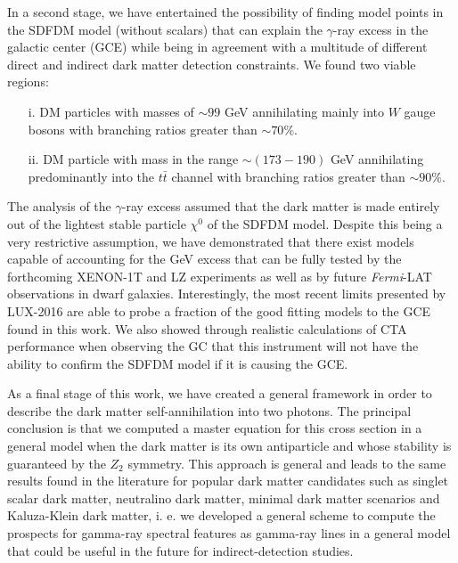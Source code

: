 In a second stage, we have entertained the possibility of finding model points in the SDFDM model (without scalars) that can explain the $\gamma$-ray excess in the galactic center (GCE) while being in agreement with a multitude of different direct and indirect dark matter detection constraints. We found two viable regions: 
%
\begin{itemize}
\item[i.]  DM particles with masses of $\sim 99$ GeV annihilating mainly into $W$ gauge bosons with branching ratios greater than $\sim 70\%$.
\item[ii.] DM particle with mass in the range $\sim (173-190)$ GeV annihilating predominantly into the $t\bar{t}$ channel with branching ratios greater than $\sim 90\%$.
\end{itemize}
%
The analysis of the $\gamma$-ray excess assumed that the dark matter is made entirely out of the lightest stable particle $\chi^0$ of the SDFDM model. Despite this being a very restrictive assumption, we have demonstrated that there exist models capable of accounting for the GeV excess that can be fully tested by the forthcoming XENON-1T and LZ experiments as well as by future \textit{Fermi}-LAT observations in dwarf galaxies. Interestingly, the most recent limits presented by LUX-2016 are able to probe a fraction of the good fitting models to the GCE found in this work. We also showed through realistic calculations of CTA performance when observing the GC that this instrument will not have the ability to confirm the SDFDM model if it is causing the GCE.


As a final stage of this work, we have created a general framework in order to describe the dark matter self-annihilation into two photons. The principal conclusion is that we computed a master equation for this cross section in a general model when the dark matter is its own antiparticle and whose stability is guaranteed by the $Z_2$ symmetry.
This approach is general and leads to the same results found in the literature for popular dark matter candidates such as singlet scalar dark matter, neutralino dark matter, minimal dark matter scenarios and Kaluza-Klein dark matter, i. e. we developed a general scheme to compute the prospects for gamma-ray spectral features as gamma-ray lines in a general model that could be useful in the future for indirect-detection studies.





 